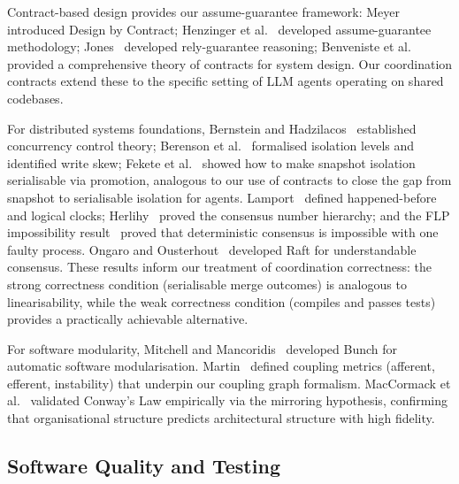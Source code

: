 \documentclass[11pt, a4paper, logo, copyright]{googledeepmind}
\begin{document}
Contract-based design provides our assume-guarantee framework:
Meyer~\citep{meyer1992} introduced Design by Contract; Henzinger
et al.~\citep{henzinger2002} developed assume-guarantee methodology;
Jones~\citep{Jones1983} developed rely-guarantee reasoning; Benveniste
et al.~\citep{Benveniste2018} provided a comprehensive theory of contracts for
system design.  Our coordination contracts extend these to the specific setting
of LLM agents operating on shared codebases.

For distributed systems foundations, Bernstein and Hadzilacos~\citep{BernsteinHadzilacos1987} established concurrency control theory; Berenson et al.~\citep{Berenson1995} formalised isolation levels and identified write skew; Fekete et al.~\citep{Fekete2005} showed how to make snapshot isolation serialisable via promotion, analogous to our use of contracts to close the gap from snapshot to serialisable isolation for agents. Lamport~\citep{Lamport1978} defined happened-before and logical clocks; Herlihy~\citep{Herlihy1991} proved the consensus number hierarchy; and the FLP impossibility result~\citep{FLP1985} proved that deterministic consensus is impossible with one faulty process. Ongaro and Ousterhout~\citep{Ongaro2014} developed Raft for understandable consensus. These results inform our treatment of coordination correctness: the strong correctness condition (serialisable merge outcomes) is analogous to linearisability, while the weak correctness condition (compiles and passes tests) provides a practically achievable alternative.

For software modularity, Mitchell and Mancoridis~\citep{Mitchell2006bunch} developed Bunch for automatic software modularisation. Martin~\citep{Martin1994} defined coupling metrics (afferent, efferent, instability) that underpin our coupling graph formalism. MacCormack et al.~\citep{MacCormack2012} validated Conway's Law empirically via the mirroring hypothesis, confirming that organisational structure predicts architectural structure with high fidelity.


\subsection{Software Quality and Testing}
\end{document}
